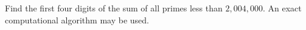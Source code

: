 Find the first four digits of the sum of all primes less than $2{,}004{,}000$. An exact computational algorithm may be used.
